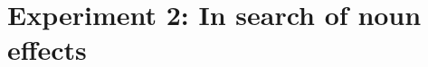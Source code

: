 \documentclass[12pt]{article}
\begin{document}



%










\section{Experiment 2: In search of noun effects}
\end{document}

